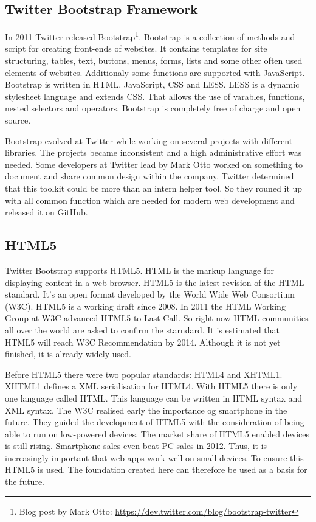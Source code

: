 \subsection{Twitter Bootstrap Framework}
In 2011 Twitter released Bootstrap\footnote{Blog post by Mark Otto: \url{https://dev.twitter.com/blog/bootstrap-twitter}}. Bootstrap is a collection of methods and script for creating front-ends of websites. It contains templates for site structuring, tables, text, buttons, menus, forms, lists and some other often used elements of websites. Additionaly some functions are supported with JavaScript. Bootstrap is written in HTML, JavaScript, CSS and LESS. LESS is a dynamic stylesheet language and extends CSS. That allows the use of varables, functions, nested selectors and operators.\cite{less} Bootstrap is completely free of charge and open source. \cite{bootstrap}

Bootstrap evolved at Twitter while working on several projects with different libraries. The projects became inconsistent and a high administrative effort was needed. Some developers at Twitter lead by Mark Otto worked on something to document and share common design within the company. Twitter determined that this toolkit could be more than an intern helper tool. So they rouned it up with all common function which are needed for modern web development and released it on GitHub. \cite{markotto}

\subsection{HTML5}
Twitter Bootstrap supports HTML5. HTML is the markup language for displaying content in a web browser. HTML5 is the latest revision of the HTML standard. It's an open format developed by the World Wide Web Consortium (W3C). HTML5 is a working draft since 2008. In 2011 the HTML Working Group at W3C advanced HTML5 to Last Call. So right now HTML communities all over the world are asked to confirm the starndard.  It is estimated that HTML5 will reach W3C Recommendation by 2014.\cite{html:lastcall} Although it is not yet finished, it is already widely used.

Before HTML5  there were two popular standards: HTML4 and XHTML1. XHTML1 defines a XML serialisation for HTML4. With HTML5 there is only one language called HTML. This language can be written in HTML syntax and XML syntax. 
\cite{html:5differences} The W3C realised early the importance og smartphone in the future. They guided the development of HTML5 with the consideration of being able to run on low-powered devices. The market share of HTML5 enabled devices is still rising. \cite{smartphonesales} Smartphone sales even beat PC sales in 2012. Thus, it is increasingly important that web apps work well on small devices. To ensure this HTML5 is used. The foundation created here can therefore be used as a basis for the future.

